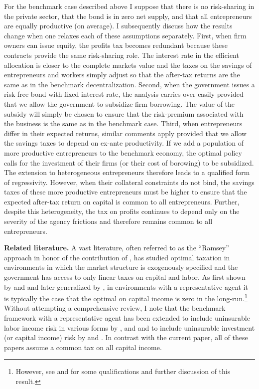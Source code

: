 \documentclass[11pt]{article}
\theoremstyle{plain}
\theoremstyle{definition} %
\begin{document}
For the benchmark case described above I suppose that there is no risk-sharing in the private sector, that the bond is in zero net supply, and that all entrepreneurs are equally productive (on average). I subsequently discuss how the results change when one relaxes each of these assumptions separately. First, when firm owners can issue equity, the profits tax becomes redundant because these contracts provide the same risk-sharing role. The interest rate in the efficient allocation is closer to the complete markets value and the taxes on the savings of entrepreneurs and workers simply adjust so that the after-tax returns are the same as in the benchmark decentralization. Second, when the government issues a risk-free bond with fixed interest rate, the analysis carries over easily provided that we allow the government 
to subsidize firm borrowing. The value of the subsidy will simply be chosen to ensure that the risk-premium associated with the business is the same as in the benchmark case. Third, when entrepreneurs differ in their expected returns, similar comments apply provided that we allow the savings taxes to depend on ex-ante productivity. If we add a population of more productive entrepreneurs to the benchmark economy, the optimal policy calls for the investment of their firms (or their cost of borowing) to be subsidized. The extension to heterogeneous entrepreneurs therefore leads to a qualified form of regressivity. However, when their collateral constraints do not bind, the savings taxes of these more productive entrepreneurs must be higher to ensure that the expected after-tax return on capital is common to all entrepreneurs. Further, despite this heterogeneity, the tax on profits continues to depend only on the severity of the agency frictions and therefore remains common to all entrepreneurs.


\textbf{Related literature.} A vast literature, often referred to as the ``Ramsey'' approach in honor of the contribution of \cite{ramsey_contribution_1927}, has studied optimal taxation in environments in which the market structure is exogenously specified and the government has access to only linear taxes on capital and labor. As first shown by \cite{chamley_optimal_1986} and \cite{judd_redistributive_1985} and later generalized by \cite{chari_taxing_1999}, in environments with a representative agent it is typically the case that the optimal on capital income is zero in the long-run.\footnote{However, see \cite{straub_positive_2020} and \cite{chari_optimal_2020} for some qualifications and further discussion of this result.} Without attempting a comprehensive review, I note that the benchmark framework with a representative agent has been extended to include uninsurable labor income risk in various forms by \cite{aiyagari_optimal_1995}, \cite{conesa_taxing_2009} and \cite{dyrda_optimal_2022} and to include uninsurable investment (or capital income) risk by \cite{panousi_optimal_2012} and \cite{evans_optimal_2014}. In contrast with the current paper, all of these papers assume a common tax on all capital income. 
\end{document}
